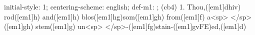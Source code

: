 initial-style: 1;
centering-scheme: english;
def-m1: \grealign;
(cb4) 1. Thou,([em1]dhiv) rod([em1]h) and([em1]h) blos([em1]hg)som([em1]gh) from([em1]f) a<sp> </sp>([em1]gh) stem([em1]g) un<sp>    </sp>-([em1]fg)stain-([em1]gvFE)ed,([em1]d)